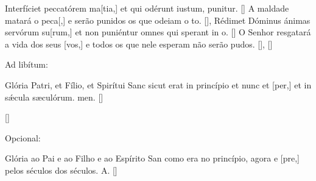 {  %
  {Interfíciet peccatórem ma[tia,] et qui odérunt iustum, puni\-tur. [\LinkLA]}%
    {A maldade matará o peca[,] e serão punidos os que odeiam o to. [\LinkPT]},
  {Rédimet Dóminus ánimas servórum su[rum,] et non puniéntur omnes qui sperant in o. [\LinkLA]}%
    {O Senhor resgatará a vida dos seus [vos,] e todos os que nele esperam não serão pudos. [\LinkPT]},
  []{\begin{rubrica}Ad libítum:\end{rubrica} Glória Patri, et Fílio, et Spirítui Sanc sicut erat in princípio et nunc et [per,] et in sǽcula sæculórum. men. [\LinkLA]}%
    []{\begin{rubrica}Opcional:\end{rubrica} Glória ao Pai e ao Filho e ao Espírito San como era no princípio, agora e [pre,] pelos séculos dos séculos. A. [\LinkPT]}
}